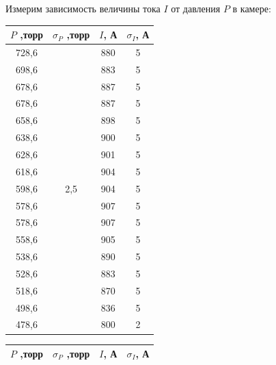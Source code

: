 \documentclass[a4paper,12pt]{report}
\begin{document}
Измерим зависимость величины тока $I$ от давления $P$ в камере:

\begin{table}[H]
\begin{tabular}{|c|c|c|c|}
\hline
$P$ ,торр & $\sigma_P$ ,торр          & $I$, А & $\sigma_I$, А \\ \hline
728,6   & \multirow{17}{*}{2,5} & 880  & 5         \\ \cline{1-1} \cline{3-4} 
698,6   &                       & 883  & 5         \\ \cline{1-1} \cline{3-4} 
678,6   &                       & 887  & 5         \\ \cline{1-1} \cline{3-4} 
678,6   &                       & 887  & 5         \\ \cline{1-1} \cline{3-4} 
658,6   &                       & 898  & 5         \\ \cline{1-1} \cline{3-4} 
638,6   &                       & 900  & 5         \\ \cline{1-1} \cline{3-4} 
628,6   &                       & 901  & 5         \\ \cline{1-1} \cline{3-4} 
618,6   &                       & 904  & 5         \\ \cline{1-1} \cline{3-4} 
598,6   &                       & 904  & 5         \\ \cline{1-1} \cline{3-4} 
578,6   &                       & 907  & 5         \\ \cline{1-1} \cline{3-4} 
578,6   &                       & 907  & 5         \\ \cline{1-1} \cline{3-4} 
558,6   &                       & 905  & 5         \\ \cline{1-1} \cline{3-4} 
538,6   &                       & 890  & 5         \\ \cline{1-1} \cline{3-4} 
528,6   &                       & 883  & 5         \\ \cline{1-1} \cline{3-4} 
518,6   &                       & 870  & 5         \\ \cline{1-1} \cline{3-4} 
498,6   &                       & 836  & 5         \\ \cline{1-1} \cline{3-4} 
478,6   &                       & 800  & 2         \\ \hline
\end{tabular}
\hspace{1cm}
\begin{tabular}{|c|c|c|c|}
\hline
$P$ ,торр & $\sigma_P$ ,торр          & $I$, А & $\sigma_I$, А  \\ \hline

\end{tabular}
\end{table}
\end{document}
